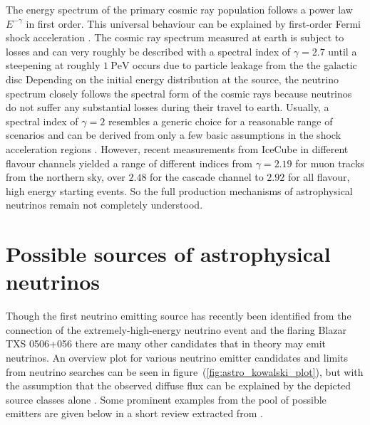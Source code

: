 The energy spectrum of the primary cosmic ray population follows a power law $E^{-\gamma}$ in first order.
This universal behaviour can be explained by first-order Fermi shock acceleration .
The cosmic ray spectrum measured at earth is subject to losses and can very roughly be described with a spectral index of $\gamma=\num{2.7}$ until a steepening at roughly $\SI{1}{\peta\eV}$ occurs due to particle leakage from the the galactic disc 
Depending on the initial energy distribution at the source, the neutrino spectrum closely follows the spectral form of the cosmic rays because neutrinos do not suffer any substantial losses during their travel to earth.
Usually, a spectral index of $\gamma=2$ resembles a generic choice for a reasonable range of scenarios and can be derived from only a few basic assumptions in the shock acceleration regions .
However, recent measurements from IceCube in different flavour channels yielded a range of different indices from $\gamma=\num{2.19}$  for muon tracks from the northern sky, over $\num{2.48}$  for the cascade channel to $\num{2.92}$  for all flavour, high energy starting events.
So the full production mechanisms of astrophysical neutrinos remain not completely understood.

\section{Possible sources of astrophysical neutrinos}
Though the first neutrino emitting source has recently been identified from the connection of the extremely-high-energy neutrino event and the flaring Blazar TXS 0506+056  there are many other candidates that in theory may emit neutrinos.
An overview plot for various neutrino emitter candidates and limits from neutrino searches can be seen in figure~(\ref{fig:astro_kowalski_plot}), but with the assumption that the observed diffuse flux can be explained by the depicted source classes alone .
Some prominent examples from the pool of possible emitters are given below in a short review extracted from .

